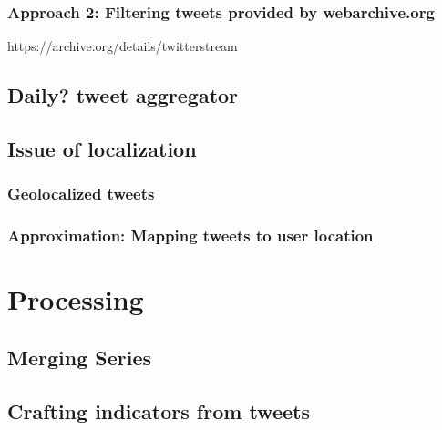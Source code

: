 \subsubsection*{Approach 2: Filtering tweets provided by webarchive.org}
https://archive.org/details/twitterstream

\subsection*{Daily? tweet aggregator}


\subsection*{Issue of localization}

\subsubsection*{Geolocalized tweets}

\subsubsection*{Approximation: Mapping tweets to user location}


\section*{Processing}

\subsection*{Merging Series}

\subsection*{Crafting indicators from tweets}